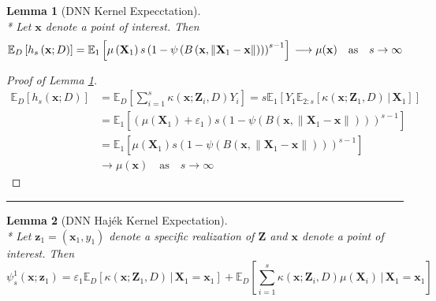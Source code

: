 \documentclass[letterpaper,10pt]{article}
\numberwithin{equation}{section}
\numberwithin{thm}{section}
\newtheorem{lem}{Lemma}
\numberwithin{lem}{section}
\numberwithin{cor}{section}
\newcommand{\E}{\mathbb{E}}
\newcommand{\1}{\mathbbm{1}}
\begin{document}
\begin{lem}[DNN Kernel Expecctation]\label{lem:DNN_k_exp}\mbox{}\\*
	Let $\mathbf{x}$ denote a point of interest.
	Then
	\begin{equation}
		\E_D\left[h_s\left(\mathbf{x}; D\right)\right]
		= \E_{1}\left[\mu\left(\mathbf{X}_1\right) s\left(1 - \psi\left(B\left(\mathbf{x}, \|\mathbf{X}_1 - \mathbf{x}\|\right)\right)\right)^{s-1}\right]\\
		\longrightarrow \mu(\mathbf{x}) \quad \text{as} \quad s \rightarrow \infty
	\end{equation}
\end{lem}

\begin{proof}[Proof of Lemma \ref{lem:DNN_k_exp}]
	\begin{equation}
		\begin{aligned}
			\E_D\left[h_s\left(\mathbf{x}; D\right)\right]
			 & = \E_D\left[\sum_{i = 1}^{s} \kappa\left(\mathbf{x}; \mathbf{Z}_i, D\right) Y_i\right]
			= s \E_{1}\left[Y_1 \E_{2:s}\left[\kappa\left(\mathbf{x}; \mathbf{Z}_1, D\right)\, | \, \mathbf{X}_1 \right]\right]                                                                \\
			 & = \E_{1}\left[\left(\mu\left(\mathbf{X}_1\right) + \varepsilon_1\right) s\left(1 - \psi\left(B\left(\mathbf{x}, \|\mathbf{X}_1 - \mathbf{x}\|\right)\right)\right)^{s-1}\right] \\
			 & = \E_{1}\left[\mu\left(\mathbf{X}_1\right) s\left(1 - \psi\left(B\left(\mathbf{x}, \|\mathbf{X}_1 - \mathbf{x}\|\right)\right)\right)^{s-1}\right]                              \\
			 & \longrightarrow \mu(\mathbf{x}) \quad \text{as} \quad s \rightarrow \infty
		\end{aligned}
	\end{equation}
\end{proof}

\hrule

\begin{lem}[DNN Haj\'ek Kernel Expectation]\label{lem:psi_s_1}\mbox{}\\*
	Let $\mathbf{z}_1 = (\mathbf{x}_1, y_1)$ denote a specific realization of $\mathbf{Z}$ and $\mathbf{x}$ denote a point of interest.
	Then
	\begin{equation}
		\psi_{s}^{1}\left(\mathbf{x}; \mathbf{z}_1\right)
		= \varepsilon_1 \E_D\left[\kappa\left(\mathbf{x}; \mathbf{Z}_1, D\right)\, \Big| \, \mathbf{X}_1 = \mathbf{x}_1 \right]
		+ \E_{D}\left[\sum_{i = 1}^{s} \kappa\left(\mathbf{x}; \mathbf{Z}_i, D\right) \mu(\mathbf{X}_i)\, \Big| \, \mathbf{X}_1 = \mathbf{x}_1 \right]
	\end{equation}
\end{lem}
\end{document}
